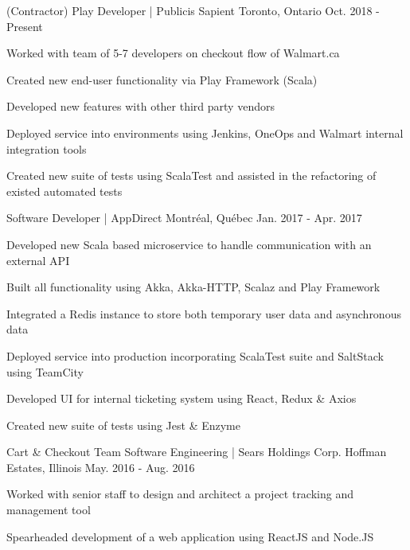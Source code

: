 \begin{cventries}
    {(Contractor) Play Developer | Publicis Sapient}
    {Toronto, Ontario}
    {Oct. 2018 - Present}
    {
      \begin{cvitems}
        \item {Worked with team of 5-7  developers on checkout flow of Walmart.ca}
        \item {Created new end-user functionality via Play Framework (Scala) }
        \item {Developed new features with other third party vendors}
        \item {Deployed service into environments using Jenkins, OneOps and Walmart internal integration tools}
        \item {Created new suite of tests using ScalaTest and assisted in the refactoring of existed automated tests}
      \end{cvitems}
    }
    {\vspace{-3mm}Software Developer | AppDirect}
    {Montréal, Québec}
    {Jan. 2017 - Apr. 2017 }
    {
      \begin{cvitems}
        \item {Developed new Scala based microservice to handle communication with an external API}
        \item {Built all functionality using Akka, Akka-HTTP, Scalaz and Play Framework}
        \item {Integrated a Redis instance to store both temporary user data and asynchronous data}
        \item {Deployed service into production incorporating ScalaTest suite and SaltStack using TeamCity}
        \item {Developed UI for internal ticketing system using React, Redux \& Axios}
        \item {Created new suite of tests using Jest \& Enzyme}
      \end{cvitems}
    }
    \cventry
    {Cart \& Checkout Team}
    {Software Engineering | Sears Holdings Corp.}
    {Hoffman Estates, Illinois}
    {May. 2016 - Aug. 2016}
    {
      \begin{cvitems}
        \item {Worked with senior staff to design and architect a project tracking and management tool}
       \item {Spearheaded development of a web application using ReactJS and Node.JS}

\end{cvitems}}
\end{cventries}
